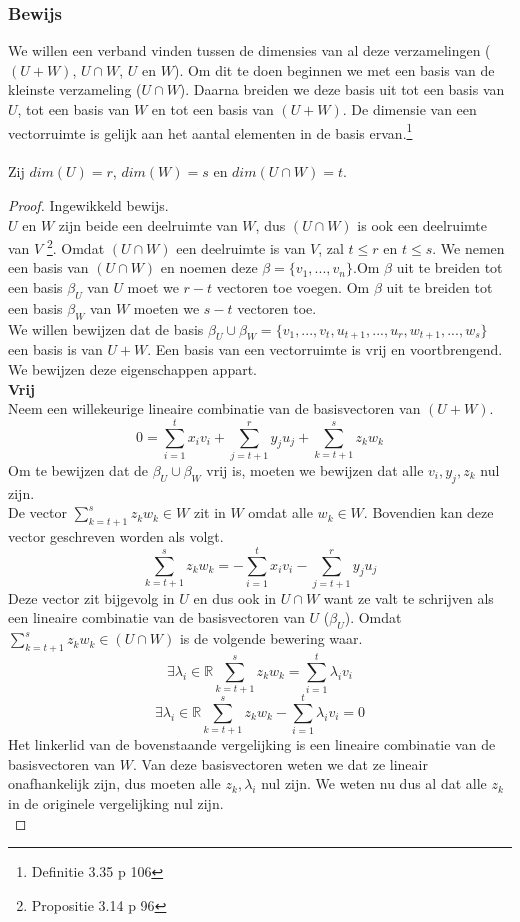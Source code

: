 \documentclass[lineaire_algebra_oplossingen.tex]{subfiles}
\begin{document}
\subsubsection*{Bewijs}
We willen een verband vinden tussen de dimensies van al deze verzamelingen ($(U+W)$, $U\cap W$, $U$ en $W$). Om dit te doen beginnen we met een basis van de kleinste verzameling ($U \cap W$). Daarna breiden we deze basis uit tot een basis van $U$, tot een basis van $W$ en tot een basis van $(U + W)$. De dimensie van een vectorruimte is gelijk aan het aantal elementen in de basis ervan.\footnote{Definitie 3.35 p 106}\\\\
Zij $dim(U) = r$, $dim(W)=s$ en $dim(U\cap W) = t$.
\begin{proof}
Ingewikkeld bewijs.\\
$U$ en $W$ zijn beide een deelruimte van $W$, dus $(U \cap W)$ is ook een deelruimte van $V$ \footnote{Propositie 3.14 p 96}. Omdat $(U \cap W)$ een deelruimte is van $V$, zal $t \le r$ en $t \le s$. We nemen een basis van $(U\cap W)$ en noemen deze $\beta = \{v_1,...,v_n\}$.Om $\beta$ uit te breiden tot een basis $\beta_U$ van $U$ moet we $r-t$ vectoren toe voegen. Om $\beta$ uit te breiden tot een basis $\beta_W$ van $W$ moeten we $s-t$ vectoren toe.\\
We willen bewijzen dat de basis $\beta_U \cup \beta_W = \{v_1,...,v_t,u_{t+1},...,u_{r},w_{t+1},...,w_{s}\}$ een basis is van $U+W$.
Een basis van een vectorruimte is vrij en voortbrengend. We bewijzen deze eigenschappen appart.\\
\textbf{Vrij}\\
Neem een willekeurige lineaire combinatie van de basisvectoren van $(U+W)$.
\[
0 = \sum_{i=1}^tx_iv_i + \sum_{j=t+1}^ry_ju_j + \sum_{k=t+1}^sz_kw_k
\]
Om te bewijzen dat de $\beta_U \cup \beta_W$ vrij is, moeten we bewijzen dat alle $v_i,y_j,z_k$ nul zijn.\\
De vector $\sum_{k=t+1}^sz_kw_k \in W$ zit in $W$ omdat alle $w_k \in W$. Bovendien kan deze vector geschreven worden als volgt.
\[
\sum_{k=t+1}^sz_kw_k = -\sum_{i=1}^tx_iv_i - \sum_{j=t+1}^ry_ju_j
\]
Deze vector zit bijgevolg in $U$ en dus ook in $U\cap W$ want ze valt te schrijven als een lineaire combinatie van de basisvectoren van $U$ ($\beta_U$).
Omdat $\sum_{k=t+1}^sz_kw_k \in (U\cap W)$ is de volgende bewering waar.
\[
\exists \lambda_i \in \mathbb{R} \sum_{k=t+1}^sz_kw_k = \sum_{i=1}^t\lambda_iv_i
\]
\[
\exists \lambda_i \in \mathbb{R} \sum_{k=t+1}^sz_kw_k - \sum_{i=1}^t\lambda_iv_i = 0 
\]
Het linkerlid van de bovenstaande vergelijking is een lineaire combinatie van de basisvectoren van $W$. Van deze basisvectoren weten we dat ze lineair onafhankelijk zijn, dus moeten alle $z_k, \lambda_i$ nul zijn. We weten nu dus al dat alle $z_k$ in de originele vergelijking nul zijn.\\

\end{proof}
\end{document}
